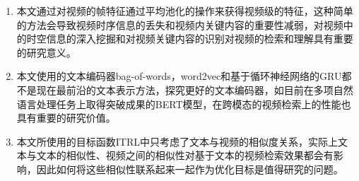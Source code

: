     \begin{enumerate}[\hspace{2em}1.]
        \item 本文通过对视频的帧特征通过平均池化的操作来获得视频级的特征，这种简单的方法会导致视频时序信息的丢失和视频内关键内容的重要性减弱，对视频中的时空信息的深入挖掘和对视频关键内容的识别对视频的检索和理解具有重要的研究意义。

        \item 本文使用的文本编码器bag-of-words，word2vec和基于循环神经网络的GRU都不是现在最前沿的文本表示方法，探究更好的文本编码器，如目前在多项自然语言处理任务上取得突破成果的BERT模型，在跨模态的视频检索上的性能也具有重要的研究价值。

        \item 本文所使用的目标函数ITRL中只考虑了文本与视频的相似度关系，实际上文本与文本的相似性、视频之间的相似性对基于文本的视频检索效果都会有影响，因此如何将这些相似性联系起来一起作为优化目标是值得研究的问题。

    \end{enumerate}
